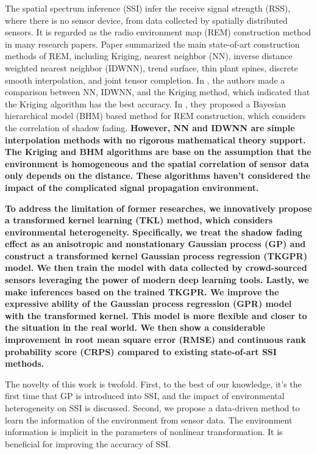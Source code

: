 \documentclass[journal, oneside, twocolumn]{IEEEtran}
\newcommand{\bl}[1]{\bf\color{blue}#1}
\begin{document}
The spatial spectrum inference (SSI) infer the receive signal strength (RSS), where there is no sensor device, from data collected by spatially distributed sensors. It is regarded as the radio environment map (REM) construction method in many research papers\cite{Sato2017, Li2018, Han2019, Xu2021}. Paper\cite{Li2018} summarized the main state-of-art construction methods of REM, including Kriging, nearest neighbor (NN), inverse distance weighted nearest neighbor (IDWNN), trend surface, thin plant spines, discrete smooth interpolation, and joint tensor completion. In \cite{Han2019}, the authors made a comparison between NN, IDWNN, and the Kriging method, which indicated that the Kriging algorithm has the best accuracy. In \cite{Xu2021}, they proposed a Bayesian hierarchical model (BHM) based method for REM construction, which considers the correlation of shadow fading. {\bl However, NN and IDWNN are simple interpolation methods with no rigorous mathematical theory support. The Kriging and BHM algorithms are base on the assumption that the environment is homogeneous and the spatial correlation of sensor data only depends on the distance. These algorithms haven't considered the impact of the complicated signal propagation environment.}


{\bl To address the limitation of former researches, we innovatively propose a transformed kernel learning (TKL) method, which considers environmental heterogeneity. Specifically, we treat the shadow fading effect as an anisotropic and nonstationary Gaussian process (GP) and construct a transformed kernel Gaussian process regression (TKGPR) model. We then train the model with data collected by crowd-sourced sensors leveraging the power of modern deep learning tools. Lastly, we make inferences based on the trained TKGPR. 
We improve the expressive ability of the Gaussian process regression (GPR) model with the transformed kernel. This model is more flexible and closer to the situation in the real world. We then show a considerable improvement in root mean square error (RMSE) and continuous rank probability score (CRPS)\cite{Gneiting2007} compared to existing state-of-art SSI methods. 

The novelty of this work is twofold. First, to the best of our knowledge, it's the first time that GP is introduced into SSI, and the impact of environmental heterogeneity on SSI is discussed. Second, we propose a data-driven method to learn the information of the environment from sensor data. The environment information is implicit in the parameters of nonlinear transformation. It is beneficial for improving the accuracy of SSI.
}
\end{document}
